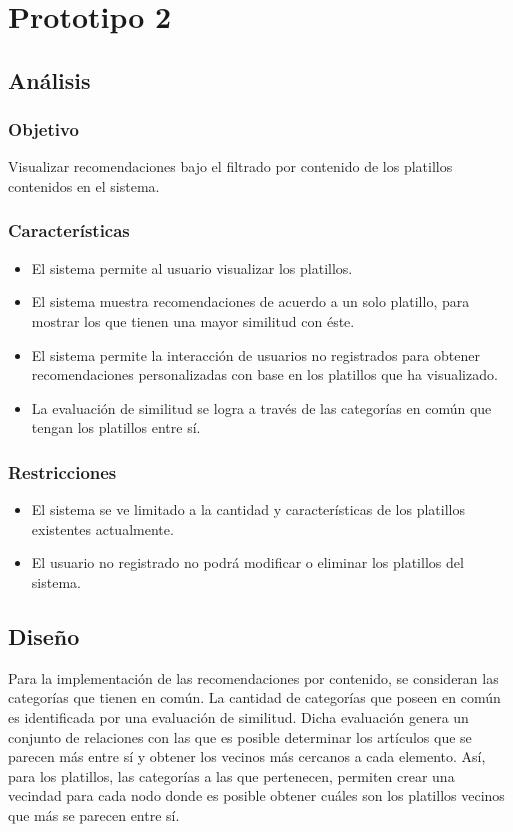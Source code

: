 \chapter{Prototipo 2}
  \section{Análisis}
    \subsection{Objetivo}
      Visualizar recomendaciones bajo el filtrado por contenido de los platillos contenidos en el sistema. 

    \subsection{Características}
    \begin{itemize}
      \item El sistema permite al usuario visualizar los platillos.
      \item El sistema muestra recomendaciones de acuerdo a un solo platillo, para mostrar los que tienen una mayor similitud con éste.
      \item El sistema permite la interacción de usuarios no registrados para obtener recomendaciones personalizadas con base en los platillos que ha visualizado.
      \item La evaluación de similitud se logra a través de las categorías en común que tengan los platillos entre sí.
    \end{itemize}

    \subsection{Restricciones}
    \begin{itemize}
      \item El sistema se ve limitado a la cantidad y características de los platillos existentes actualmente.
      \item El usuario no registrado no podrá modificar o eliminar los platillos del sistema.
    \end{itemize}

  \section{Diseño}
    Para la implementación de las recomendaciones por contenido, se consideran las categorías que tienen en común. La cantidad de categorías que poseen en común es identificada por una evaluación de similitud. Dicha evaluación genera un conjunto de relaciones con las que es posible determinar los artículos que se parecen más entre sí y obtener los vecinos más cercanos a cada elemento. Así, para los platillos, las categorías a las que pertenecen, permiten crear una vecindad para cada nodo donde es posible obtener cuáles son los platillos vecinos que más se parecen entre sí.

